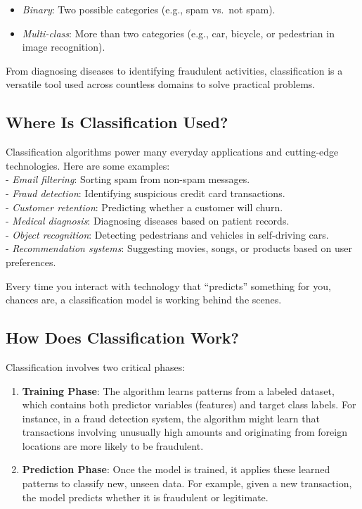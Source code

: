 \documentclass[
  11pt,
]{book}
\providecommand{\tightlist}{%
  \setlength{\itemsep}{0pt}\setlength{\parskip}{0pt}}
\theoremstyle{definition}
\theoremstyle{definition}
\theoremstyle{definition}
\theoremstyle{definition}
\theoremstyle{remark}
\begin{document}
\begin{itemize}
\tightlist
\item
  \emph{Binary}: Two possible categories (e.g., spam vs.~not spam).\\
\item
  \emph{Multi-class}: More than two categories (e.g., car, bicycle, or pedestrian in image recognition).
\end{itemize}

From diagnosing diseases to identifying fraudulent activities, classification is a versatile tool used across countless domains to solve practical problems.

\subsection*{Where Is Classification Used?}\label{where-is-classification-used}


Classification algorithms power many everyday applications and cutting-edge technologies. Here are some examples:\\
- \emph{Email filtering}: Sorting spam from non-spam messages.\\
- \emph{Fraud detection}: Identifying suspicious credit card transactions.\\
- \emph{Customer retention}: Predicting whether a customer will churn.\\
- \emph{Medical diagnosis}: Diagnosing diseases based on patient records.\\
- \emph{Object recognition}: Detecting pedestrians and vehicles in self-driving cars.\\
- \emph{Recommendation systems}: Suggesting movies, songs, or products based on user preferences.

Every time you interact with technology that ``predicts'' something for you, chances are, a classification model is working behind the scenes.

\subsection*{How Does Classification Work?}\label{how-does-classification-work}


Classification involves two critical phases:

\begin{enumerate}
\def\labelenumi{\arabic{enumi}.}
\tightlist
\item
  \textbf{Training Phase}: The algorithm learns patterns from a labeled dataset, which contains both predictor variables (features) and target class labels. For instance, in a fraud detection system, the algorithm might learn that transactions involving unusually high amounts and originating from foreign locations are more likely to be fraudulent.\\
\item
  \textbf{Prediction Phase}: Once the model is trained, it applies these learned patterns to classify new, unseen data. For example, given a new transaction, the model predicts whether it is fraudulent or legitimate.
\end{enumerate}
\end{document}
